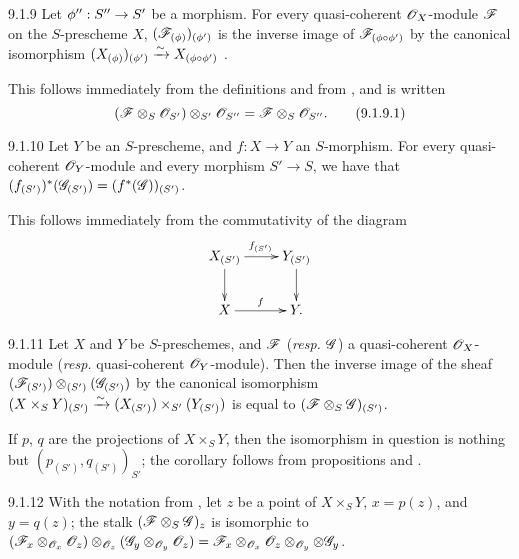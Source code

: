 \begin{envs}[Proposition]{9.1.9}
\label{prop-1.9.1.9}
Let $\phi'':S''\to S'$ be a morphism.
For every quasi-coherent $\mathscr{O}_X$-module $\mathscr{F}$ on the $S$-prescheme $X$,
$(\mathscr{F}_{(\phi)})_{(\phi')}$ is the inverse image of
$\mathscr{F}_{(\phi\circ\phi')}$ by the canonical isomorphism
$(X_{(\phi)})_{(\phi')}\xrightarrow{\sim} X_{(\phi\circ\phi')}$
.
\end{envs}

This follows immediately from the definitions and from , and is
written
\[
  (\mathscr{F}\otimes_S\mathscr{O}_{S'})\otimes_{S'}\mathscr{O}_{S''}=\mathscr{F}\otimes_S\mathscr{O}_{S''}.
  \tag{9.1.9.1}
\]

\begin{envs}[Proposition]{9.1.10}
\label{prop-1.9.1.10}
Let $Y$ be an $S$-prescheme, and $f:X\to Y$ an $S$-morphism.
For every quasi-coherent $\mathscr{O}_Y$-module and every morphism
$S'\to S$, we have that
$(f_{(S')})^*(\mathscr{G}_{(S')})=(f^*(\mathscr{G}))_{(S')}$.
\end{envs}

This follows immediately from the commutativity of the diagram
\[
  \xymatrix{
    X_{(S')}\ar[r]^{f_{(S')}}\ar[d] & Y_{(S')}\ar[d]\\
    X\ar[r]^f & Y.
  }
\]

\begin{envs}[Corollary]{9.1.11}
\label{cor-1.9.1.11}
Let $X$ and $Y$ be $S$-preschemes, and
$\mathscr{F}$ (\emph{resp.} $\mathscr{G}$) a quasi-coherent $\mathscr{O}_X$-module
(\emph{resp.} quasi-coherent $\mathscr{O}_Y$-module). Then the inverse image of the sheaf
$(\mathscr{F}_{(S')})\otimes_{(S')}(\mathscr{G}_{(S')})$ by the canonical isomorphism
$(X\times_S Y)_{(S')}\xrightarrow{\sim}(X_{(S')})\times_{S'}(Y_{(S')})$
 is equal to $(\mathscr{F}\otimes_S\mathscr{G})_{(S')}$.
\end{envs}

If $p$, $q$ are the projections of $X\times_S Y$, then the isomorphism in question
is nothing but $(p_{(S')}, q_{(S')})_{S'}$; the corollary follows from
propositions  and .

\begin{envs}[Proposition]{9.1.12}
\label{prop-1.9.1.12}
With the notation from , let $z$ be
a point of $X\times_S Y$, $x=p(z)$, and $y=q(z)$; the stalk
$(\mathscr{F}\otimes_S\mathscr{G})_z$ is isomorphic to
$(\mathscr{F}_x\otimes_{\mathscr{O}_x}\mathscr{O}_z)\otimes_{\mathscr{O}_z}(\mathscr{G}_y\otimes_{\mathscr{O}_y}\mathscr{O}_z)
=\mathscr{F}_x\otimes_{\mathscr{O}_x}\mathscr{O}_z\otimes_{\mathscr{O}_y}\otimes\mathscr{G}_y$.
\end{envs}

